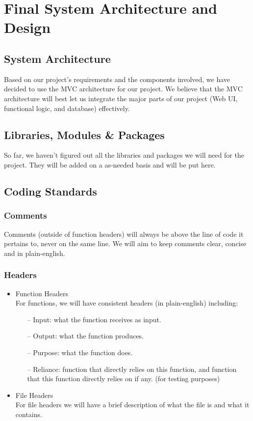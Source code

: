 \section{Final System Architecture and Design}

\subsection{System Architecture}
Based on our project's requirements and the components involved, we have decided to use the MVC architecture for our project. We believe that the MVC architecture will best let us integrate the major parts of our project (Web UI, functional logic, and database) effectively.

\subsection{Libraries, Modules \& Packages}
So far, we haven't figured out all the libraries and packages we will need for the project. They will be added on a as-needed basis and will be put here.

\subsection{Coding Standards}
\subsubsection{Comments}
Comments (outside of function headers) will always be above the line of code it pertains to, never on the same line. We will aim to keep comments clear, concise and in plain-english.

\subsubsection{Headers}

\begin{itemize}
    \item Function Headers \\
    For functions, we will have consistent headers (in plain-english) including:
    \begin{itemize}
        \item [--] Input: what the function receives as input.
        \item [--] Output: what the function produces.
        \item [--] Purpose: what the function does.
        \item [--] Reliance: function that directly relies on this function, and function that this function directly relies on if any. (for testing purposes)
    \end{itemize}

    \item File Headers \\
    For file headers we will have a brief description of what the file is and what it contains.
\end{itemize}

